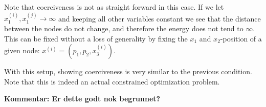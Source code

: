 Note that coerciveness is not as straight forward in this case. If we let $x_1^{(i)}, x_1^{(j)} \to \infty$ and keeping all other variables constant we see that the distance between the nodes do not change, and therefore the energy does not tend to $\infty$. This can be fixed without a loss of generality by fixing the $x_1$ and $x_2$-position of a given node: $x^{(i)} = (p_1,p_2,x^{(i)}_3)$.

With this setup, showing coerciveness is very similar to the previous condition. Note that this is indeed an actual constrained optimization problem. 

\textbf{Kommentar: Er dette godt nok begrunnet?}

